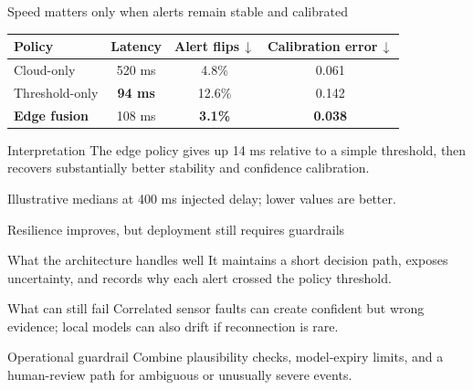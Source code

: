 \begin{frame}{Speed matters only when alerts remain stable and calibrated}
  \centering
  \small
  \renewcommand{\arraystretch}{1.28}
  \begin{tabular}{>{\raggedright\arraybackslash}p{3.25cm}ccc}
    \toprule
    \textbf{Policy} &
    \textbf{Latency} &
    \textbf{Alert flips}$\,\downarrow$ &
    \textbf{Calibration error}$\,\downarrow$ \\
    \midrule
    Cloud-only & 520 ms & 4.8\% & 0.061 \\
    Threshold-only & \textbf{94 ms} & 12.6\% & 0.142 \\
    \rowcolor{AstraTeal!12}
    \textbf{Edge fusion} & 108 ms & \textbf{3.1\%} & \textbf{0.038} \\
    \bottomrule
  \end{tabular}

  \vspace{0.45cm}
  \begin{block}{Interpretation}
    The edge policy gives up 14 ms relative to a simple threshold, then recovers substantially better stability and confidence calibration.
  \end{block}

  \vfill
  \scriptsize\color{AstraInk!75}
  Illustrative medians at 400 ms injected delay; lower values are better.
\end{frame}

\begin{frame}{Resilience improves, but deployment still requires guardrails}
  \begin{block}{What the architecture handles well}
    It maintains a short decision path, exposes uncertainty, and records why each alert crossed the policy threshold.
  \end{block}

  \begin{alertblock}{What can still fail}
    Correlated sensor faults can create confident but wrong evidence; local models can also drift if reconnection is rare.
  \end{alertblock}

  \begin{exampleblock}{Operational guardrail}
    Combine plausibility checks, model-expiry limits, and a human-review path for ambiguous or unusually severe events.
  \end{exampleblock}
\end{frame}
